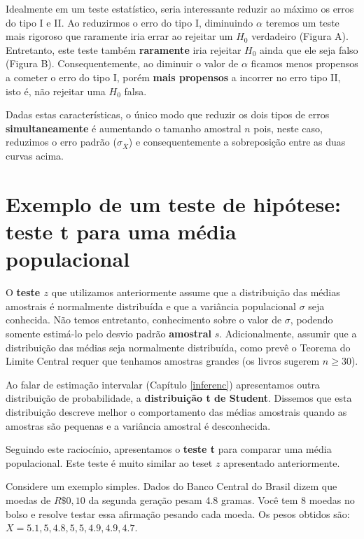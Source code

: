 \documentclass[
]{book}
\begin{document}
Idealmente em um teste estatístico, seria interessante reduzir ao máximo os erros do tipo I e II. Ao reduzirmos o erro do tipo I, diminuindo \(\alpha\) teremos um teste mais rigoroso que raramente iria errar ao rejeitar um \(H_0\) verdadeiro (Figura A). Entretanto, este teste também \textbf{raramente} iria rejeitar \(H_0\) ainda que ele seja falso (Figura B). Consequentemente, ao diminuir o valor de \(\alpha\) ficamos menos propensos a cometer o erro do tipo I, porém \textbf{mais propensos} a incorrer no erro tipo II, isto é, não rejeitar uma \(H_0\) falsa.

Dadas estas características, o único modo que reduzir os dois tipos de erros \textbf{simultaneamente} é aumentando o tamanho amostral \(n\) pois, neste caso, reduzimos o erro padrão (\(\sigma_{\overline{X}}\)) e consequentemente a sobreposição entre as duas curvas acima.

\hypertarget{exemplo-de-um-teste-de-hipuxf3tese-teste-t-para-uma-muxe9dia-populacional}{%
\section{Exemplo de um teste de hipótese: teste t para uma média populacional}\label{exemplo-de-um-teste-de-hipuxf3tese-teste-t-para-uma-muxe9dia-populacional}}

O \textbf{teste \(z\)} que utilizamos anteriormente assume que a distribuição das médias amostrais é normalmente distribuída e que a variância populacional \(\sigma\) seja conhecida. Não temos entretanto, conhecimento sobre o valor de \(\sigma\), podendo somente estimá-lo pelo desvio padrão \textbf{amostral} \(s\). Adicionalmente, assumir que a distribuição das médias seja normalmente distribuída, como prevê o Teorema do Limite Central requer que tenhamos amostras grandes (os livros sugerem \(n \ge 30\)).

Ao falar de estimação intervalar (Capítulo \ref{inferenc}) apresentamos outra distribuição de probabilidade, a \textbf{distribuição t de Student}. Dissemos que esta distribuição descreve melhor o comportamento das médias amostrais quando as amostras são pequenas e a variância amostral é desconhecida.

Seguindo este raciocínio, apresentamos o \textbf{teste t} para comparar uma média populacional. Este teste é muito similar ao teset \(z\) apresentado anteriormente.

Considere um exemplo simples. Dados do Banco Central do Brasil dizem que moedas de \(R\$ 0,10\) da segunda geração pesam 4.8 gramas. Você tem \(8\) moedas no bolso e resolve testar essa afirmação pesando cada moeda. Os pesos obtidos são: \(X = 5.1, 5, 4.8, 5, 5, 4.9, 4.9, 4.7\).
\end{document}
